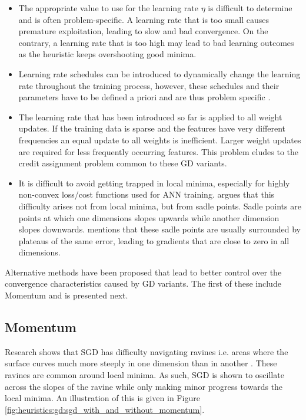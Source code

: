 \begin{itemize}
    \item The appropriate value to use for the learning rate $\eta$ is difficult to determine and is often problem-specific. A learning rate that is too small causes premature exploitation, leading to slow and bad convergence. On the contrary, a learning rate that is too high may lead to bad learning outcomes as the heuristic keeps overshooting good minima.
    
    \item Learning rate schedules \cite{ref:robbins:1951} can be introduced to dynamically change the learning rate throughout the training process, however, these schedules and their parameters have to be defined a priori and are thus problem specific \cite{ref:darken:1992}.
    
    \item The learning rate that has been introduced so far is applied to all weight updates. If the training data is sparse and the features have very different frequencies an equal update to all weights is inefficient. Larger weight updates are required for less frequently occurring features. This problem eludes to the credit assignment problem \cite{ref:rumelhart:1986} common to these \ac{GD} variants.
    
    \item It is difficult to avoid getting trapped in local minima, especially for highly non-convex loss/cost functions used for \ac{ANN} training. \cite{ref:dauphin:2014} argues that this difficulty arises not from local minima, but from sadle points. Sadle points are points at which one dimensions slopes upwards while another dimension slopes downwards. \cite{ref:ruder:2016} mentions that these sadle points are usually surrounded by plateaus of the same error, leading to gradients that are close to zero in all dimensions.
\end{itemize}


Alternative methods have been proposed that lead to better control over the convergence characteristics caused by \ac{GD} variants. The first of these include \ac{Momentum} and is presented next.


\subsection{Momentum}
\label{sec:heuristics:gd:momentum}

Research shows that \ac{SGD} has difficulty navigating ravines i.e. areas where the surface curves much more steeply in one dimension than in another \cite{ref:sutton:1986}. These ravines are common around local minima. As such, \ac{SGD} is shown to oscillate across the slopes of the ravine while only making minor progress towards the local minima. An illustration of this is given in Figure \ref{fig:heuristics:gd:sgd_with_and_without_momentum}.


